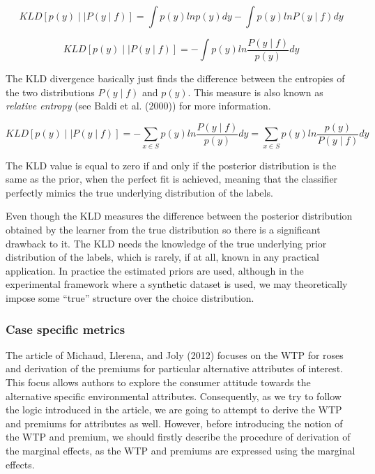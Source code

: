 \documentclass[11pt,]{article}
\begin{document}
\begin{equation}
KLD [p(y) \mid \mid P (y \mid f) ] =
  \int p(y) ln p(y) dy - 
  \int p(y) ln P(y \mid f) dy
\end{equation}

\begin{equation}
KLD [p(y) \mid \mid P (y \mid f) ] =
  - \int p(y) ln \frac{P(y \mid f)}{p(y)} dy
\end{equation}

The KLD divergence basically just finds the difference between the
entropies of the two distributions \(P (y \mid f)\) and \(p(y)\). This
measure is also known as \emph{relative entropy} (see Baldi et al.
(2000)) for more information.

\begin{equation}
KLD [p(y) \mid \mid P (y \mid f) ] = 
  - \sum_{x \in S} p(y) ln \frac{P(y \mid f)}{p(y)} dy = \sum_{x \in S} p(y) ln \frac{p(y)}{P(y \mid f)} dy
\end{equation}

The KLD value is equal to zero if and only if the posterior distribution
is the same as the prior, when the perfect fit is achieved, meaning that
the classifier perfectly mimics the true underlying distribution of the
labels.

Even though the KLD measures the difference between the posterior
distribution obtained by the learner from the true distribution so there
is a significant drawback to it. The KLD needs the knowledge of the true
underlying prior distribution of the labels, which is rarely, if at all,
known in any practical application. In practice the estimated priors are
used, although in the experimental framework where a synthetic dataset
is used, we may theoretically impose some ``true'' structure over the
choice distribution.

\hypertarget{case-specific-metrics}{%
\subsubsection{Case specific metrics}\label{case-specific-metrics}}

The article of Michaud, Llerena, and Joly (2012) focuses on the WTP for
roses and derivation of the premiums for particular alternative
attributes of interest. This focus allows authors to explore the
consumer attitude towards the alternative specific environmental
attributes. Consequently, as we try to follow the logic introduced in
the article, we are going to attempt to derive the WTP and premiums for
attributes as well. However, before introducing the notion of the WTP
and premium, we should firstly describe the procedure of derivation of
the marginal effects, as the WTP and premiums are expressed using the
marginal effects.
\end{document}
